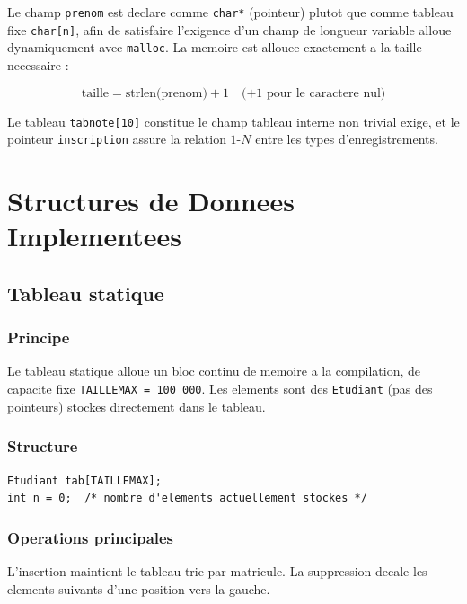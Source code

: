 \documentclass[12pt,a4paper]{article}
\begin{document}
Le champ \texttt{prenom} est declare comme \texttt{char*} (pointeur)
plutot que comme tableau fixe \texttt{char[n]}, afin de satisfaire
l'exigence d'un champ de longueur variable alloue dynamiquement avec
\texttt{malloc}. La memoire est allouee exactement a la taille necessaire :

\[
\text{taille} = \text{strlen(prenom)} + 1 \quad \text{(+1 pour le caractere nul)}
\]

Le tableau \texttt{tabnote[10]} constitue le champ tableau interne
non trivial exige, et le pointeur \texttt{inscription} assure la
relation $1$-$N$ entre les types d'enregistrements.

\section{Structures de Donnees Implementees}

\subsection{Tableau statique}

\subsubsection{Principe}

Le tableau statique alloue un bloc continu de memoire a la compilation,
de capacite fixe \texttt{TAILLEMAX = 100\,000}. Les elements sont des
\texttt{Etudiant} (pas des pointeurs) stockes directement dans le tableau.

\subsubsection{Structure}

\begin{lstlisting}[caption={Tableau statique}]
Etudiant tab[TAILLEMAX];
int n = 0;  /* nombre d'elements actuellement stockes */
\end{lstlisting}

\subsubsection{Operations principales}

L'insertion maintient le tableau trie par matricule. La suppression
decale les elements suivants d'une position vers la gauche.
\end{document}
